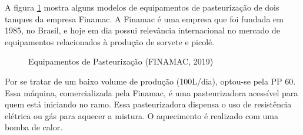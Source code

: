 \documentclass[10pt,a4paper]{article}
\begin{document}
A figura \ref{fig:example} mostra alguns modelos de equipamentos de pasteurização de dois tanques da empresa Finamac. A Finamac é uma empresa que foi fundada em 1985, no Brasil, e hoje em dia possui relevância internacional no mercado de equipamentos relacionados à produção de sorvete e picolé.
	
\begin{figure}[H]%
    \centering
    \qquad
    \caption{Equipamentos de Pasteurização (FINAMAC, 2019)}%
    \label{fig:example}%
\end{figure}


Por se tratar de um baixo volume de produção (100L/dia), optou-se pela PP 60. Essa máquina, comercializada pela Finamac, é uma pasteurizadora acessível para quem está iniciando no ramo. Essa pasteurizadora dispensa o uso de resistência elétrica ou gás para aquecer a mistura. O aquecimento é realizado com uma bomba de calor. 
\end{document}
